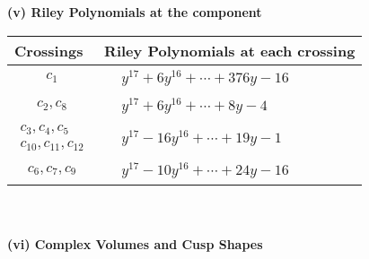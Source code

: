 \documentclass[1p]{elsarticle_modified}
\theoremstyle{definition}
\begin{document}
\newpage\renewcommand{\arraystretch}{1}
\flushleft \textbf{(v) Riley Polynomials at the component}\newline \\
\begin{tabular}{m{50pt}|m{274pt}}
Crossings & \hspace{64pt}Riley Polynomials at each crossing \\
\hline $$\begin{aligned}c_{1}\end{aligned}$$&$\begin{aligned}
&y^{17}+6 y^{16}+\cdots+376 y-16
\end{aligned}$\\
\hline $$\begin{aligned}c_{2},c_{8}\end{aligned}$$&$\begin{aligned}
&y^{17}+6 y^{16}+\cdots+8 y-4
\end{aligned}$\\
\hline $$\begin{aligned}c_{3},c_{4},c_{5}\\c_{10},c_{11},c_{12}\end{aligned}$$&$\begin{aligned}
&y^{17}-16 y^{16}+\cdots+19 y-1
\end{aligned}$\\
\hline $$\begin{aligned}c_{6},c_{7},c_{9}\end{aligned}$$&$\begin{aligned}
&y^{17}-10 y^{16}+\cdots+24 y-16
\end{aligned}$\\
\hline
\end{tabular}\\~\\
\newpage\flushleft \textbf{(vi) Complex Volumes and Cusp Shapes}
\end{document}
